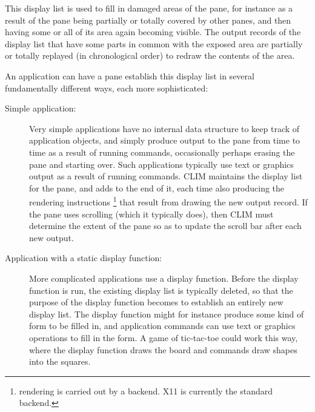 This display list is used to fill in damaged areas of the pane, for
instance as a result of the pane being partially or totally covered by
other panes, and then having some or all of its area again becoming
visible.  The output records of the display list that have some parts
in common with the exposed area are partially or totally replayed (in
chronological order) to redraw the contents of the area.

An application can have a pane establish this display list in several
fundamentally different ways, each more sophisticated:

\begin{description}
  \item[Simple application:] Very simple applications have no internal
    data structure to keep track of application objects, and simply
    produce output to the pane from time to time as a result of
    running commands, occasionally perhaps erasing the pane and
    starting over.  Such applications typically use text or graphics
    output as a result of running commands.  CLIM maintains the
    display list for the pane, and adds to the end of it, each time
    also producing the rendering instructions \footnote{rendering is
      carried out by a backend. X11 is currently the standard
      backend.} that result from drawing the new output record.  If
    the pane uses scrolling (which it typically does), then CLIM must
    determine the extent of the pane so as to update the scroll bar
    after each new output.

  \item[Application with a static display function:] More complicated
    applications use a display function.  Before the display function
    is run, the existing display list is typically deleted, so that
    the purpose of the display function becomes to establish an
    entirely new display list.  The display function might for
    instance produce some kind of form to be filled in, and
    application commands can use text or graphics operations to fill
    in the form.  A game of tic-tac-toe could work this way, where the
    display function draws the board and commands draw shapes into the
    squares.


\end{description}
